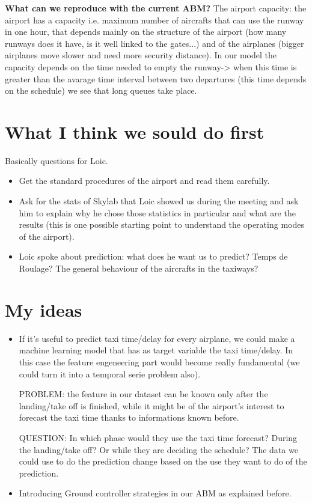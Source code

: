 \documentclass{article}
\begin{document}
\textbf{What can we reproduce with the current ABM?}  The airport capacity: the airport has a capacity i.e. maximum number of aircrafts that can use the runway in one hour, that depends mainly on the structure of the airport (how many runways does it have, is it well linked to the gates...) and of the airplanes (bigger airplanes move slower and need more security distance). In our model the capacity depends on the time needed to empty the runway-> when this time is greater than the avarage time interval between two departures (this time depends on the schedule) we see that long queues take place.


\section*{What I think we sould do first}
Basically questions for Loic.
\begin{itemize}
\item Get the standard procedures of the airport and read them carefully.
\item Ask for the stats of Skylab that Loic showed us during the meeting and ask him to explain why he chose those statistics in particular and what are the results (this is one possible starting point to understand the operating modes of the airport).
\item Loic spoke about prediction: what does he want us to predict? Temps de Roulage? The general behaviour of the aircrafts in the taxiways?
\end{itemize}

\section*{My ideas}
\begin{itemize}
	\item If it's useful to predict taxi time/delay for every airplane, we could make a machine learning model that has as target variable the taxi time/delay. In this case the feature engeneering part would become really fundamental (we could turn it into a temporal serie problem also).
	
	PROBLEM: the feature in our dataset can be known only after the landing/take off is finished, while it might be of the airport's interest to forecast the taxi time thanks to informations known before.
	
	QUESTION: In which phase would they use the taxi time forecast? During the landing/take off? Or while they are deciding the schedule? The data we could use to do the prediction change based on the use they want to do of the prediction.
	
	
	\item Introducing Ground controller strategies in our ABM as explained before.
\end{itemize}
\end{document}
